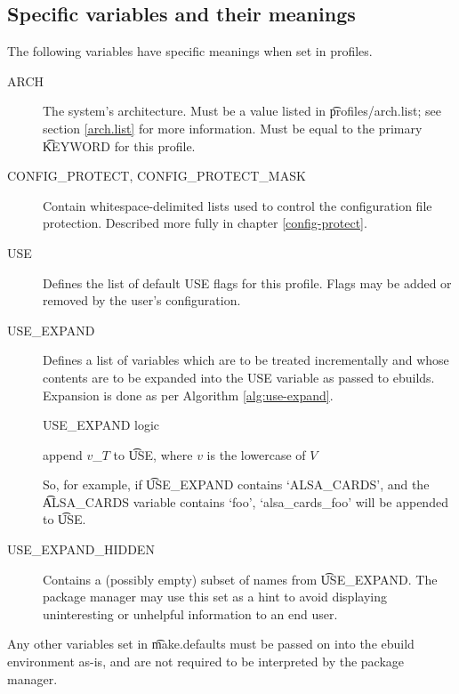 \subsection{Specific variables and their meanings}
The following variables have specific meanings when set in profiles.
\begin{description}
\item[ARCH] The system's architecture. Must be a value listed in \t{profiles/arch.list}; see section
    \ref{arch.list} for more information. Must be equal to the primary \t{KEYWORD} for this profile.
\item[CONFIG\_PROTECT, CONFIG\_PROTECT\_MASK] Contain whitespace-delimited lists used to control the
    configuration file protection. Described more fully in chapter \ref{config-protect}.
\item[USE] Defines the list of default USE flags for this profile. Flags may be added or removed by
    the user's configuration.
\item[USE\_EXPAND] \label{use-expand} Defines a list of variables which are to be treated
    incrementally and whose contents are to be expanded into the USE variable as passed to ebuilds.
    Expansion is done as per Algorithm \ref{alg:use-expand}.
    \begin{algorithm}
    \caption{USE\_EXPAND logic} \label{alg:use-expand}
    \begin{algorithmic}
                \STATE append $v$\_$T$ to \t{USE}, where $v$ is the lowercase of $V$
            \ENDFOR
        \ENDFOR
    \end{algorithmic}
    \end{algorithm}
    So, for example, if \t{USE\_EXPAND} contains `ALSA\_CARDS', and the \t{ALSA\_CARDS} variable
    contains `foo', `alsa\_cards\_foo' will be appended to \t{USE}.
\item[USE\_EXPAND\_HIDDEN] Contains a (possibly empty) subset of names from \t{USE\_EXPAND}. The
    package manager may use this set as a hint to avoid displaying uninteresting or unhelpful
    information to an end user.
\end{description}

Any other variables set in \t{make.defaults} must be passed on into the ebuild environment as-is,
and are not required to be interpreted by the package manager.

